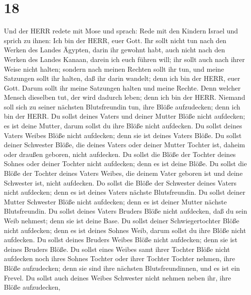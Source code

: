 \hypertarget{section-17}{%
\section{18}\label{section-17}}

 Und der HERR redete mit Mose und sprach:  Rede
mit den Kindern Israel und sprich zu ihnen: Ich bin der HERR, euer Gott.
 Ihr sollt nicht tun nach den Werken des Landes Ägypten,
darin ihr gewohnt habt, auch nicht nach den Werken des Landes Kanaan,
darein ich euch führen will; ihr sollt auch nach ihrer Weise nicht
halten;  sondern nach meinen Rechten sollt ihr tun, und
meine Satzungen sollt ihr halten, daß ihr darin wandelt; denn ich bin
der HERR, euer Gott.  Darum sollt ihr meine Satzungen halten
und meine Rechte. Denn welcher Mensch dieselben tut, der wird dadurch
leben; denn ich bin der HERR.  Niemand soll sich zu seiner
nächsten Blutsfreundin tun, ihre Blöße aufzudecken; denn ich bin der
HERR.  Du sollst deines Vaters und deiner Mutter Blöße nicht
aufdecken; es ist deine Mutter, darum sollst du ihre Blöße nicht
aufdecken.  Du sollst deines Vaters Weibes Blöße nicht
aufdecken; denn sie ist deines Vaters Blöße.  Du sollst
deiner Schwester Blöße, die deines Vaters oder deiner Mutter Tochter
ist, daheim oder draußen geboren, nicht aufdecken.  Du
sollst die Blöße der Tochter deines Sohnes oder deiner Tochter nicht
aufdecken; denn es ist deine Blöße.  Du sollst die Blöße
der Tochter deines Vaters Weibes, die deinem Vater geboren ist und deine
Schwester ist, nicht aufdecken.  Do sollst die Blöße der
Schwester deines Vaters nicht aufdecken; denn es ist deines Vaters
nächste Blutsfreundin.  Du sollst deiner Mutter Schwester
Blöße nicht aufdecken; denn es ist deiner Mutter nächste Blutsfreundin.
 Du sollst deines Vaters Bruders Blöße nicht aufdecken, daß
du sein Weib nehmest; denn sie ist deine Base.  Du sollst
deiner Schwiegertochter Blöße nicht aufdecken; denn es ist deines Sohnes
Weib, darum sollst du ihre Blöße nicht aufdecken.  Du
sollst deines Bruders Weibes Blöße nicht aufdecken; denn sie ist deines
Bruders Blöße.  Du sollst eines Weibes samt ihrer Tochter
Blöße nicht aufdecken noch ihres Sohnes Tochter oder ihrer Tochter
Tochter nehmen, ihre Blöße aufzudecken; denn sie sind ihre nächsten
Blutsfreundinnen, und es ist ein Frevel.  Du sollst auch
deines Weibes Schwester nicht nehmen neben ihr, ihre Blöße aufzudecken,
